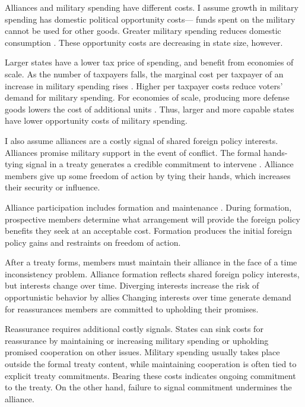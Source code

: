 \documentclass[12pt]{article}
\begin{document}
Alliances and military spending have different costs. 
I assume growth in military spending has domestic political opportunity costs--- funds spent on the military cannot be used for other goods. 
Greater military spending reduces domestic consumption \citep{Fearon2018}. 
These opportunity costs are decreasing in state size, however. 


Larger states have a lower tax price of spending, and benefit from economies of scale. 
As the number of taxpayers falls, the marginal cost per taxpayer of an increase in military spending rises \citep{DudleyMontmarquette1981}. 
Higher per taxpayer costs reduce voters' demand for military spending. 
For economies of scale, producing more defense goods lowers the cost of additional units \citep{Moravcsik1991, AlesinaSpolaore2006}. 
Thus, larger and more capable states have lower opportunity costs of military spending. 


I also assume alliances are a costly signal of shared foreign policy interests. 
Alliances promise military support in the event of conflict. 
The formal hands-tying signal in a treaty generates a credible commitment to intervene \citep{Fearon1997, Leeds2003}.
Alliance members give up some freedom of action by tying their hands, which increases their security or influence. 


Alliance participation includes formation and maintenance \citep{Snyder1997}. 
During formation, prospective members determine what arrangement will provide the foreign policy benefits they seek at an acceptable cost. 
Formation produces the initial foreign policy gains and restraints on freedom of action. 


After a treaty forms, members must maintain their alliance in the face of a time inconsistency problem. 
Alliance formation reflects shared foreign policy interests, but interests change over time. 
Diverging interests increase the risk of opportunistic behavior by allies \citep{Leeds2003a, LeedsSavun2007}
Changing interests over time generate demand for reassurances members are committed to upholding their promises. 


Reassurance requires additional costly signals. 
States can sink costs for reassurance by maintaining or increasing military spending or upholding promised cooperation on other issues.
Military spending usually takes place outside the formal treaty content, while maintaining cooperation is often tied to explicit treaty commitments. 
Bearing these costs indicates ongoing commitment to the treaty. 
On the other hand, failure to signal commitment undermines the alliance. 
\end{document}
